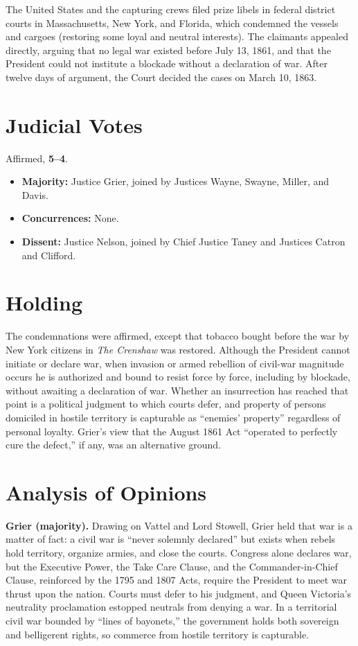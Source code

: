 \documentclass[12pt]{article}
\begin{document}
The United States and the capturing crews filed prize libels in federal district courts in Massachusetts, New York, and Florida, which condemned the vessels and cargoes (restoring some loyal and neutral interests). The claimants appealed directly, arguing that no legal war existed before July 13, 1861, and that the President could not institute a blockade without a declaration of war. After twelve days of argument, the Court decided the cases on March 10, 1863.

\section{Judicial Votes}

Affirmed, \textbf{5--4}.
\begin{itemize}
\item \textbf{Majority:} Justice Grier, joined by Justices Wayne, Swayne, Miller, and Davis.
\item \textbf{Concurrences:} None.
\item \textbf{Dissent:} Justice Nelson, joined by Chief Justice Taney and Justices Catron and Clifford.
\end{itemize}

\section{Holding}

The condemnations were affirmed, except that tobacco bought before the war by New York citizens in \textit{The Crenshaw} was restored. Although the President cannot initiate or declare war, when invasion or armed rebellion of civil-war magnitude occurs he is authorized and bound to resist force by force, including by blockade, without awaiting a declaration of war. Whether an insurrection has reached that point is a political judgment to which courts defer, and property of persons domiciled in hostile territory is capturable as ``enemies' property'' regardless of personal loyalty. Grier's view that the August 1861 Act ``operated to perfectly cure the defect,'' if any, was an alternative ground.

\section{Analysis of Opinions}

\textbf{Grier (majority).} Drawing on Vattel and Lord Stowell, Grier held that war is a matter of fact: a civil war is ``never solemnly declared'' but exists when rebels hold territory, organize armies, and close the courts. Congress alone declares war, but the Executive Power, the Take Care Clause, and the Commander-in-Chief Clause, reinforced by the 1795 and 1807 Acts, require the President to meet war thrust upon the nation. Courts must defer to his judgment, and Queen Victoria's neutrality proclamation estopped neutrals from denying a war. In a territorial civil war bounded by ``lines of bayonets,'' the government holds both sovereign and belligerent rights, so commerce from hostile territory is capturable.
\end{document}
